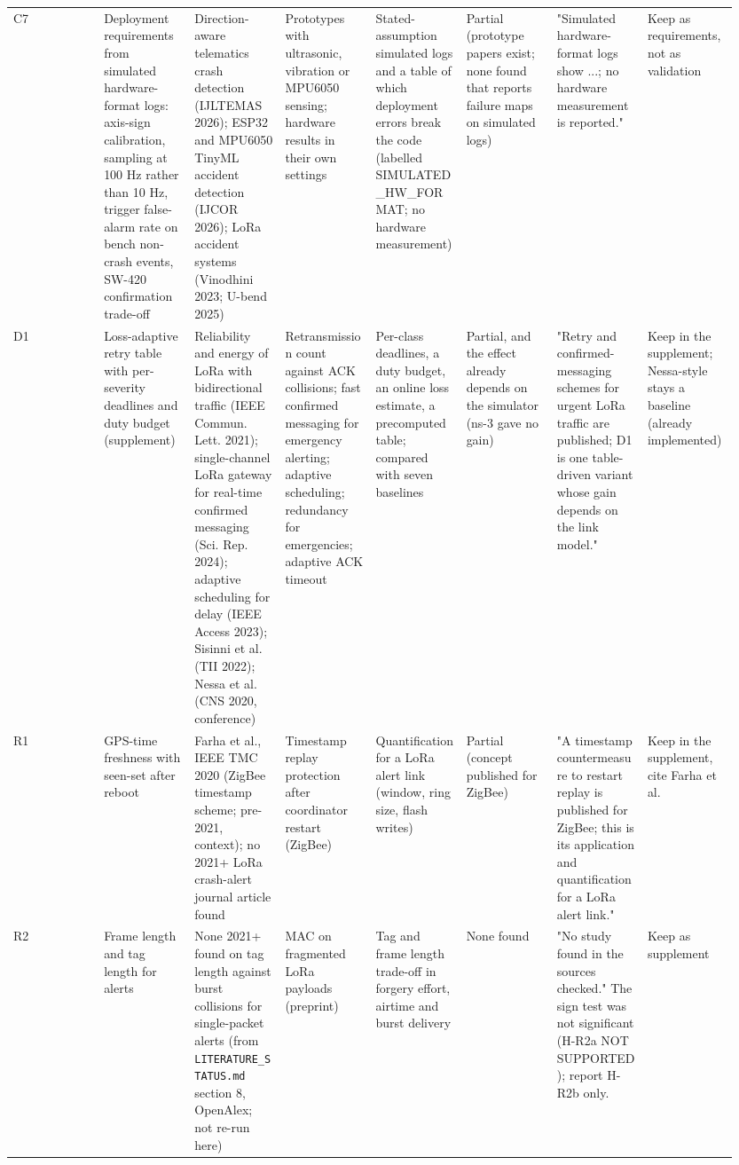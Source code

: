 {\begin{longtable}{p{0.119\linewidth}p{0.119\linewidth}p{0.119\linewidth}p{0.119\linewidth}p{0.119\linewidth}p{0.119\linewidth}p{0.119\linewidth}p{0.119\linewidth}}
C7 & Deployment requirements from simulated hardware-format logs: axis-sign calibration, sampling at 100 Hz rather than 10 Hz, trigger false-alarm rate on bench non-crash events, SW-420 confirmation trade-off & Direction-aware telematics crash detection (IJLTEMAS 2026); ESP32 and MPU6050 TinyML accident detection (IJCOR 2026); LoRa accident systems (Vinodhini 2023; U-bend 2025) & Prototypes with ultrasonic, vibration or MPU6050 sensing; hardware results in their own settings & Stated-assumption simulated logs and a table of which deployment errors break the code (labelled SIMULATED\_HW\_FORMAT; no hardware measurement) & Partial (prototype papers exist; none found that reports failure maps on simulated logs) & "Simulated hardware-format logs show ...; no hardware measurement is reported." & Keep as requirements, not as validation \\
D1 & Loss-adaptive retry table with per-severity deadlines and duty budget (supplement) & Reliability and energy of LoRa with bidirectional traffic (IEEE Commun. Lett. 2021); single-channel LoRa gateway for real-time confirmed messaging (Sci. Rep. 2024); adaptive scheduling for delay (IEEE Access 2023); Sisinni et al. (TII 2022); Nessa et al. (CNS 2020, conference) & Retransmission count against ACK collisions; fast confirmed messaging for emergency alerting; adaptive scheduling; redundancy for emergencies; adaptive ACK timeout & Per-class deadlines, a duty budget, an online loss estimate, a precomputed table; compared with seven baselines & Partial, and the effect already depends on the simulator (ns-3 gave no gain) & "Retry and confirmed-messaging schemes for urgent LoRa traffic are published; D1 is one table-driven variant whose gain depends on the link model." & Keep in the supplement; Nessa-style stays a baseline (already implemented) \\
R1 & GPS-time freshness with seen-set after reboot & Farha et al., IEEE TMC 2020 (ZigBee timestamp scheme; pre-2021, context); no 2021+ LoRa crash-alert journal article found & Timestamp replay protection after coordinator restart (ZigBee) & Quantification for a LoRa alert link (window, ring size, flash writes) & Partial (concept published for ZigBee) & "A timestamp countermeasure to restart replay is published for ZigBee; this is its application and quantification for a LoRa alert link." & Keep in the supplement, cite Farha et al. \\
R2 & Frame length and tag length for alerts & None 2021+ found on tag length against burst collisions for single-packet alerts (from \texttt{LITERATURE\_STATUS.md} section 8, OpenAlex; not re-run here) & MAC on fragmented LoRa payloads (preprint) & Tag and frame length trade-off in forgery effort, airtime and burst delivery & None found & "No study found in the sources checked." The sign test was not significant (H-R2a NOT SUPPORTED); report H-R2b only. & Keep as supplement \\

\end{longtable}}
